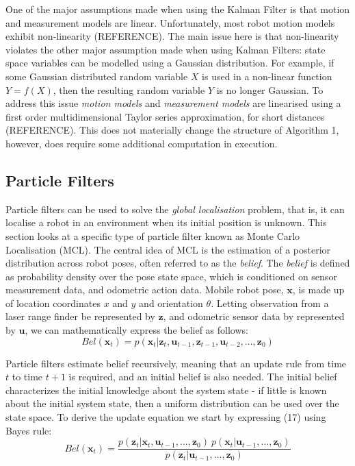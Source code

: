 \documentclass[a4paper]{article}
\begin{document}
One of the major assumptions made when using the Kalman Filter is that motion and measurement models are linear. Unfortunately, most robot motion models exhibit non-linearity (REFERENCE). The main issue here is that non-linearity violates the other major assumption made when using Kalman Filters: state space variables can be modelled using a Gaussian distribution. For example, if some Gaussian distributed random variable $X$ is used in a non-linear function $Y = f(X)$, then the resulting random variable $Y$ is no longer Gaussian. To address this issue \textit{motion models} and \textit{measurement models} are linearised using a first order multidimensional Taylor series approximation, for short distances (REFERENCE). This does not materially change the structure of Algorithm 1, however, does require some additional computation in execution. 

\subsection{Particle Filters}
Particle filters can be used to solve the \textit{global localisation} problem, that is, it can localise a robot in an environment when its initial position is unknown. This section looks at a specific type of particle filter known as Monte Carlo Localisation (MCL). The central idea of MCL is the estimation of a posterior distribution across robot poses, often referred to as the \textit{belief}. The \textit{belief} is defined as probability density over the pose state space, which is conditioned on sensor measurement data, and odometric action data. Mobile robot pose, $\mathbf{x}$, is made up of location coordinates $x$ and $y$ and orientation $\theta$. Letting observation from a laser range finder be represented by $\mathbf{z}$, and odometric sensor data by represented by $\mathbf{u}$, we can mathematically express the belief as follows:
\begin{equation}
Bel(\mathbf{x}_t) = p(\mathbf{x}_t | \mathbf{z}_t, \mathbf{u}_{t-1}, \mathbf{z}_{t-1}, \mathbf{u}_{t-2},\ldots,\mathbf{z}_0)
\end{equation}

Particle filters estimate belief recursively, meaning that an update rule from time $t$ to time $t+1$ is required, and an initial belief is also needed. The initial belief characterizes the initial knowledge about the system state - if little is known about the initial system state, then a uniform distribution can be used over the state space. To derive the update equation we start by expressing (17) using Bayes rule:
\begin{equation}
Bel(\mathbf{x}_t) = \frac{p(\mathbf{z}_t | \mathbf{x}_t,\mathbf{u}_{t-1},\ldots,\mathbf{z}_0) \ p(\mathbf{x}_t | \mathbf{u}_{t-1},\ldots,\mathbf{z}_0)}{p(\mathbf{z}_t | \mathbf{u}_{t-1},\ldots,\mathbf{z}_0)}
\end{equation}
\end{document}
